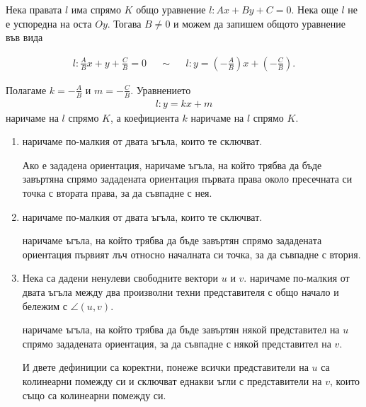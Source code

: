 \documentclass[numbers=endperiod, bibliography=totocnumbered]{scrartcl}
\begin{document}
\begin{definition}
  Нека правата \( l \) има спрямо \( K \) общо уравнение \( l: Ax + By + C = 0 \). Нека още \( l \) не е успоредна на оста \( Oy \). Тогава \( B \neq 0 \) и можем да запишем общото уравнение във вида

  \begin{align*}
    l: \frac A B x + y + \frac C B = 0
    &&\sim&&
    l: y = \left(-\frac A B \right) x + \left(-\frac C B \right).
  \end{align*}

  Полагаме \( k = -\frac A B \) и \( m = -\frac C B \). Уравнението
  \begin{align*}
    l: y = kx + m
  \end{align*}
  наричаме  на \( l \) спрямо \( K \), а коефициента \( k \) наричаме  на \( l \) спрямо \( K \).
\end{definition}

\begin{definition}
  \mbox{}
  \begin{enumerate}
    \item {} наричаме по-малкия от двата ъгъла, които те сключват.

    Ако е зададена ориентация,  наричаме ъгъла, на който трябва да бъде завъртяна спрямо зададената ориентация първата права около пресечната си точка с втората права, за да съвпадне с нея.

    \item {} наричаме по-малкия от двата ъгъла, които те сключват.

     наричаме ъгъла, на който трябва да бъде завъртян спрямо зададената ориентация първият лъч относно началната си точка, за да съвпадне с втория.

    \item Нека са дадени ненулеви свободните вектори \( u \) и \( v \).  наричаме по-малкия от двата ъгъла между два произволни техни представителя с общо начало и бележим с \( \angle(u, v) \).

     наричаме ъгъла, на който трябва да бъде завъртян някой представител на \( u \) спрямо зададената ориентация, за да съвпадне с някой представител на \( v \).

    И двете дефиниции са коректни, понеже всички представители на \( u \) са колинеарни помежду си и сключват еднакви ъгли с представители на \( v \), които също са колинеарни помежду си.
  \end{enumerate}
\end{definition}
\end{document}
